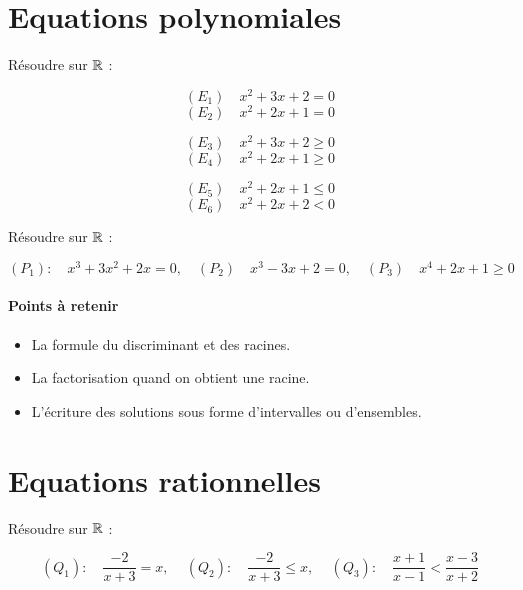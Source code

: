\documentclass[a4paper, 11pt]{article}
\begin{document}
\section{Equations polynomiales} 

\begin{exercice}
    Résoudre sur $\mathbb{R}$ :  
    \vspace{-0.5cm}
    
\begin{minipage}[t]{0.3\textwidth}
   $$(E_1) \quad  x^2+3x+2=0$$
        $$(E_2) \quad  x^2+2x+1=0$$
\end{minipage}
\begin{minipage}[t]{0.3\textwidth}
        $$(E_3) \quad x^2+3x+2\geq 0$$
        $$(E_4) \quad  x^2+2x+1\geq 0$$
\end{minipage}
\begin{minipage}[t]{0.3\textwidth}
        $$(E_5)\quad  x^2+2x+1\leq 0$$
        $$(E_6)\quad  x^2+2x+2<0$$
\end{minipage}
\end{exercice}


\begin{exercice}
    Résoudre sur $\mathbb{R}$ :
    
    $$    (P_1) :\quad   x^3+3x^2+2x=0, \quad (P_2) \quad   x^3-3x+2=0,\quad 
        (P_3) \quad x^4+2x+1\geq 0$$
    
\end{exercice}


\paragraph{Points à retenir}
\begin{itemize}
    \item  La formule du discriminant et des racines.
    \item La factorisation quand on obtient une racine.
    \item L'écriture des solutions sous forme d'intervalles ou d'ensembles.
\end{itemize}

\section{Equations rationnelles}
\begin{exercice}
    Résoudre sur $\mathbb{R}$ :



   $$ (Q_1): \quad   \frac{-2}{x+3}= x,\, \quad (Q_2): \quad   \frac{-2}{x+3}\leq x,\, \quad  (Q_3): \quad   \frac{x+1}{x-1}<\frac{x-3}{x+2}$$

\end{exercice}
\end{document}
